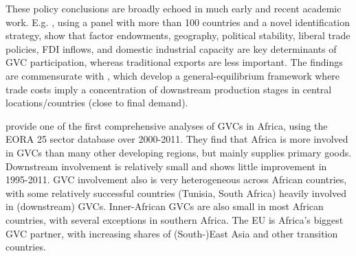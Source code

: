 \documentclass[a4paper]{article}
\begin{document}
These policy conclusions are broadly echoed in much early and recent academic work. E.g.  \citet{fernandes2022determinants}, using a panel with more than 100 countries and a novel identification strategy, show that factor endowments, geography, political stability, liberal trade policies, FDI inflows, and domestic industrial capacity are key determinants of GVC participation, whereas traditional exports are less important. The findings are commensurate with \citet{antras2020geography}, which develop a general-equilibrium framework where trade costs imply a concentration of downstream production stages in central locations/countries (close to final demand). \newline
 
 \citet{foster2015global} provide one of the first comprehensive analyses of GVCs in Africa, using the EORA 25 sector database over 2000-2011. They find that Africa is more involved in GVCs than many other developing regions, but mainly supplies primary goods. Downstream involvement is relatively small and shows little improvement in 1995-2011. GVC involvement also is very heterogeneous across African countries, with some relatively successful countries (Tunisia, South Africa) heavily involved in (downstream) GVCs. %
Inner-African GVCs are also small in most African countries, with several exceptions in southern Africa. The EU is Africa's biggest GVC partner, with increasing shares of (South-)East Asia and other transition countries. \newline
\end{document}
